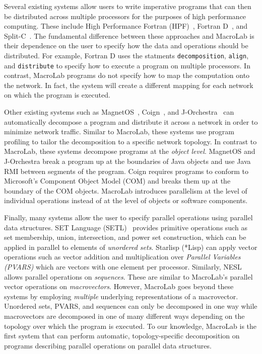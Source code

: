 Several existing systems allow users to write imperative programs that can then
be distributed across multiple processors for the purposes of high performance
computing.  These include High Performance Fortran (HPF)~\cite{Richardson},
Fortran D~\cite{Hiranandani}, and Split-C~\cite{Culler}.  The fundamental
difference between these approaches and MacroLab is their dependence on the user
to specify how the data and operations should be distributed. For example,
Fortran D uses the statments \texttt{decomposition}, \texttt{align}, and
\texttt{distribute} to specify how to execute a program on multiple processors.
In contrast, MacroLab programs do not specify how to map the computation onto
the network. In fact, the system will create a different mapping for each
network on which the program is executed.

Other existing systems such as MagnetOS~\cite{Liu}, Coign~\cite{Hunt}, and
J-Orchestra~\cite{Tilevich} can automatically decompose a program and distribute
it across a network in order to minimize network traffic.  Similar to MacroLab,
these systems use program profiling to tailor the decomposition to a specific
network topology.  In contrast to MacroLab, these systems decompose programs at
the {\em object level}.  MagnetOS and J-Orchestra break a program up at the
boundaries of Java objects and use Java RMI between segments of the program.
Coign requires programs to conform to Microsoft's Component Object Model (COM)
and breaks them up at the boundary of the COM objects.  MacroLab introduces
parallelism at the level of individual operations instead of at the level of
objects or software components.

Finally, many systems allow the user to specify parallel operations using
parallel data structures. SET Language (SETL)~\cite{Schonberg} provides
primitive operations such as set membership, union, intersection, and power set
construction, which can be applied in parallel to elements of {\em unordered
  sets}. Starlisp (*Lisp) can apply vector operations such as vector addition
and multiplication over {\em Parallel Variables (PVARS)} which are vectors with
one element per processor.  Similarly, NESL allows parallel operations on {\em
  sequences}. These are similar to MacroLab's parallel vector operations on {\em
  macrovectors}. However, MacroLab goes beyond these systems by employing {\em
  multiple} underlying representations of a macrovector.  Unordered sets, PVARS,
and sequences can only be decomposed in one way while macrovectors are
decomposed in one of many different ways depending on the topology over which
the program is executed. To our knowledge, MacroLab is the first system that can
perform automatic, topology-specific decomposition on programs describing
parallel operations on parallel data structures.

